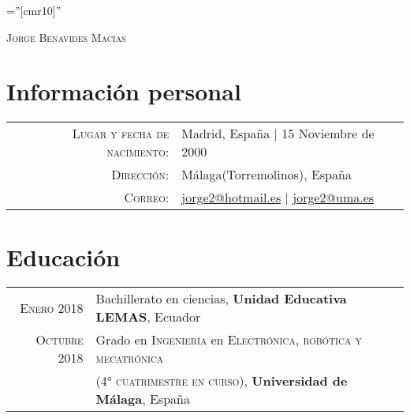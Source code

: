\documentclass[a4paper,10pt]{article}
\begin{document}
\pagestyle{empty} %
\font\fb=''[cmr10]'' %

\par{\centering
		{\Huge\textsc{Jorge Benavides Macías} %
	}\bigskip\par}

\section{Informaci\'on personal}

\begin{tabular}{rl}
    \textsc{Lugar y fecha de nacimiento:} & Madrid, España  | 15 Noviembre de 2000 \\ %
    \textsc{Direcci\'on:}   & Málaga(Torremolinos), España\\				%
    \textsc{Correo:}     & \href{mailto:jorge2@hotmail.es}{jorge2@hotmail.es} | \href{mailto:jorge2@uma.es}{jorge2@uma.es} %
\end{tabular}

\section{Educaci\'on}
\begin{tabular}{rl}
 \textsc{Enero} 2018 & Bachillerato en ciencias, \textbf{Unidad Educativa LEMAS}, Ecuador\\ %
\textsc{Octubre} 2018 & Grado en \textsc{ Ingenier\'ia} en \textsc{Electr\'onica, rob\'otica y mecatr\'onica} \\ & \textsc{(4° cuatrimestre en curso)}, \normalsize\textbf{Universidad de M\'alaga}, España\\ %
\end{tabular}

\end{document}
